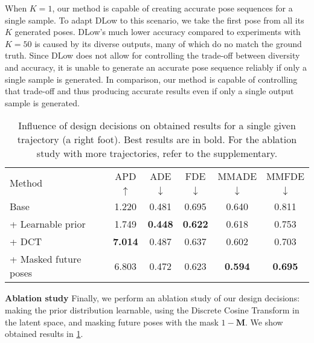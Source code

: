 \documentclass[10pt,twocolumn,letterpaper]{article}
\renewcommand{\paragraph}[1]{\noindent\textbf{#1}\enskip}
\begin{document}
When $K=1$, our method is capable of creating accurate pose sequences for a single sample. To adapt DLow to this scenario, we take the first pose from all its $K$ generated poses. DLow's much lower accuracy compared to experiments with $K=50$ is caused by its diverse outputs, many of which do no match the ground truth. Since DLow does not allow for controlling the trade-off between diversity and accuracy, it is unable to generate an accurate pose sequence reliably if only a single sample is generated. In comparison, our method is capable of controlling that trade-off and thus producing accurate results even if only a single output sample is generated.


\begin{table}[t!]
\centering
\scriptsize
\begin{tabular}{lccccc}
    \toprule
         \multirow{2}{*}{Method}  & APD  & ADE  & FDE  & MMADE  & MMFDE  \\ 
         & $\uparrow$ & $\downarrow$ & $\downarrow$& $\downarrow$& $\downarrow$\\
    \midrule             
    Base  &                      1.220 &           0.481 &           0.695 &           0.640 &           0.811 \\
    + Learnable prior &          1.749 &           \textbf{0.448} &           \textbf{0.622} &           0.618 &           0.753 \\
    + DCT  &                     \textbf{7.014} &           0.487 &           0.637 &           0.602 &           0.703 \\
    + Masked future poses &      6.803 &           0.472 &           0.623 &           \textbf{0.594} &           \textbf{0.695} \\
    \bottomrule
\end{tabular}
\caption{Influence of design decisions on obtained results for a single given trajectory (a right foot). Best results are in bold. For the ablation study with more trajectories, refer to the supplementary.}
\label{tab:ablation-study}                                
\vspace{-0.5em}
\end{table}                                          
\paragraph{Ablation study}
Finally, we perform an ablation study of our design decisions: making the prior distribution
learnable, using the Discrete Cosine Transform in the latent space, and masking future poses with the mask
$1 - \mathbf{M}$. We show obtained results in \cref{tab:ablation-study}.
\end{document}

